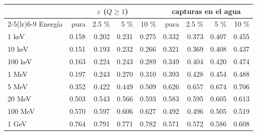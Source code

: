 \begin{tabular}{lrrrrrrrr}
\toprule
 & \multicolumn{4}{c}{$\varepsilon$ ($Q\geq1$)} & \multicolumn{4}{c}{capturas en el agua} \\
\cmidrule(lr){2-5}\cmidrule(lr){6-9}
Energía & pura & 2.5 \% & 5 \% & 10 \% & pura & 2.5 \% & 5 \% & 10 \% \\
\midrule
1 keV & 0.158 & 0.202 & 0.231 & 0.275 & 0.332 & 0.373 & 0.407 & 0.455 \\
10 keV & 0.151 & 0.193 & 0.232 & 0.266 & 0.321 & 0.369 & 0.408 & 0.437 \\
100 keV & 0.163 & 0.224 & 0.243 & 0.289 & 0.349 & 0.404 & 0.420 & 0.474 \\
1 MeV & 0.197 & 0.243 & 0.270 & 0.310 & 0.393 & 0.428 & 0.454 & 0.488 \\
5 MeV & 0.352 & 0.422 & 0.449 & 0.509 & 0.626 & 0.657 & 0.674 & 0.706 \\
20 MeV & 0.503 & 0.543 & 0.566 & 0.593 & 0.583 & 0.595 & 0.605 & 0.613 \\
100 MeV & 0.570 & 0.597 & 0.606 & 0.627 & 0.492 & 0.496 & 0.505 & 0.519 \\
1 GeV & 0.764 & 0.791 & 0.771 & 0.782 & 0.571 & 0.572 & 0.586 & 0.608 \\
\bottomrule
\end{tabular}
